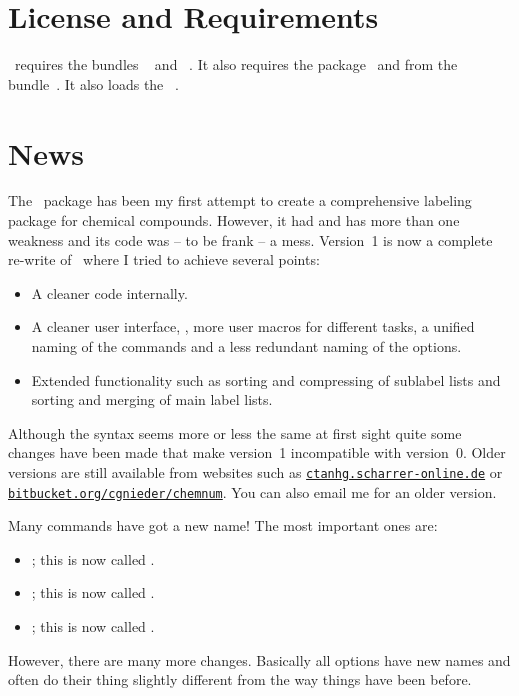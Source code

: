 \documentclass[load-preamble+,babel-options={ngerman,british,american}]{cnltx-doc}
\newcommand*\website[1]{\texttt{\href{http://#1/}{#1}}}
\newcommand*\securewebsite[1]{\texttt{\href{https://#1/}{#1}}}
\begin{document}
\section{License and Requirements}\label{sec:license-requirements}
\license

\chemnum\ requires the bundles ~\cite{bnd:l3kernel} and
~\cite{bnd:l3packages}.  It also requires the
 package~\cite{pkg:translations} and  from
the  bundle~\cite{bnd:chemmacros}.  It also loads the
~\cite{pkg:psfrag}.

\section{News}\label{sec:news}
The \chemnum\ package has been my first attempt to create a comprehensive
labeling package for chemical compounds.  However, it had and has more than
one weakness and its code was -- to be frank -- a mess.  Version~1 is now a
complete re-write of \chemnum\ where I tried to achieve several points:
\begin{itemize}
  \item A cleaner code internally.
  \item A cleaner user interface, \ie, more user macros for different tasks, a
    unified naming of the commands and a less redundant naming of the
    options.
  \item Extended functionality such as sorting and compressing of sublabel
    lists and sorting and merging of main label lists.
\end{itemize}

Although the syntax seems more or less the same at first sight quite some
changes have been made that make version~1 incompatible with version~0.
Older versions are still available
from websites such as \website{ctanhg.scharrer-online.de} or
\securewebsite{bitbucket.org/cgnieder/chemnum}.  You can also email me for an
older version.

Many commands have got a new name! The most important ones are:
\begin{itemize}
  \item {}; this is now called .
  \item {}; this is now called .
  \item {}; this is now called .
\end{itemize}
However, there are many more changes.  Basically all options have new names
and often do their thing slightly different from the way things have been
before.
\end{document}
